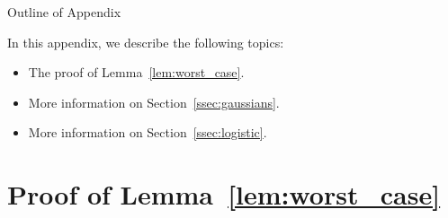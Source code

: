 \documentclass{article}
\begin{document}
\small


\normalsize

\clearpage
\appendix

\begin{center}
{\Large Outline of Appendix}
\end{center}

In this appendix, we describe the following topics:

\begin{itemize}[noitemsep]
    \item The proof of Lemma~\ref{lem:worst_case}.
    \item More information on Section~\ref{ssec:gaussians}.
    \item More information on Section~\ref{ssec:logistic}.
\end{itemize}

\section{Proof of Lemma~\ref{lem:worst_case}}\label{app:worst_case_proof}
\end{document}
